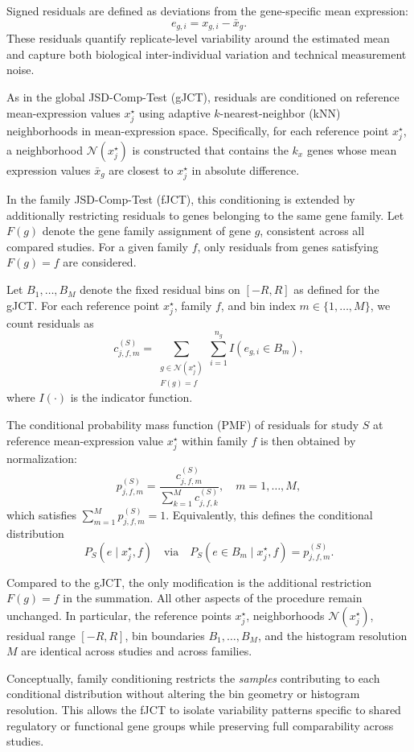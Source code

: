 Signed residuals are defined as deviations from the gene-specific mean expression:
\[
e_{g,i} = x_{g,i} - \bar{x}_g.
\]
These residuals quantify replicate-level variability around the estimated mean and capture both biological inter-individual variation and technical measurement noise.

As in the global JSD-Comp-Test (gJCT), residuals are conditioned on reference mean-expression values $x^\star_j$ using adaptive $k$-nearest-neighbor (kNN) neighborhoods in mean-expression space. Specifically, for each reference point $x^\star_j$, a neighborhood $\mathcal{N}(x^\star_j)$ is constructed that contains the $k_x$ genes whose mean expression values $\bar{x}_g$ are closest to $x^\star_j$ in absolute difference.

In the family JSD-Comp-Test (fJCT), this conditioning is extended by additionally restricting residuals to genes belonging to the same gene family. Let $F(g)$ denote the gene family assignment of gene $g$, consistent across all compared studies. For a given family $f$, only residuals from genes satisfying $F(g) = f$ are considered.

Let $B_1,\ldots,B_M$ denote the fixed residual bins on $[-R,R]$ as defined for the gJCT. For each reference point $x^\star_j$, family $f$, and bin index $m \in \{1,\ldots,M\}$, we count residuals as
\[
c^{(S)}_{j,f,m}
=
\sum_{\substack{g \in \mathcal{N}(x^\star_j) \\ F(g)=f}}
\sum_{i=1}^{n_g}
I\!\left(e_{g,i} \in B_m\right),
\]
where $I(\cdot)$ is the indicator function.

The conditional probability mass function (PMF) of residuals for study $S$ at reference mean-expression value $x^\star_j$ within family $f$ is then obtained by normalization:
\[
p^{(S)}_{j,f,m}
=
\frac{c^{(S)}_{j,f,m}}{\sum_{k=1}^{M} c^{(S)}_{j,f,k}},
\quad
m=1,\ldots,M,
\]
which satisfies $\sum_{m=1}^{M} p^{(S)}_{j,f,m} = 1$. Equivalently, this defines the conditional distribution
\[
P_S(e \mid x^\star_j, f)
\quad \text{via} \quad
P_S(e \in B_m \mid x^\star_j, f) = p^{(S)}_{j,f,m}.
\]

Compared to the gJCT, the only modification is the additional restriction $F(g)=f$ in the summation. All other aspects of the procedure remain unchanged. In particular, the reference points $x^\star_j$, neighborhoods $\mathcal{N}(x^\star_j)$, residual range $[-R,R]$, bin boundaries $B_1,\ldots,B_M$, and the histogram resolution $M$ are identical across studies and across families.

Conceptually, family conditioning restricts the \emph{samples} contributing to each conditional distribution without altering the bin geometry or histogram resolution. This allows the fJCT to isolate variability patterns specific to shared regulatory or functional gene groups while preserving full comparability across studies.

